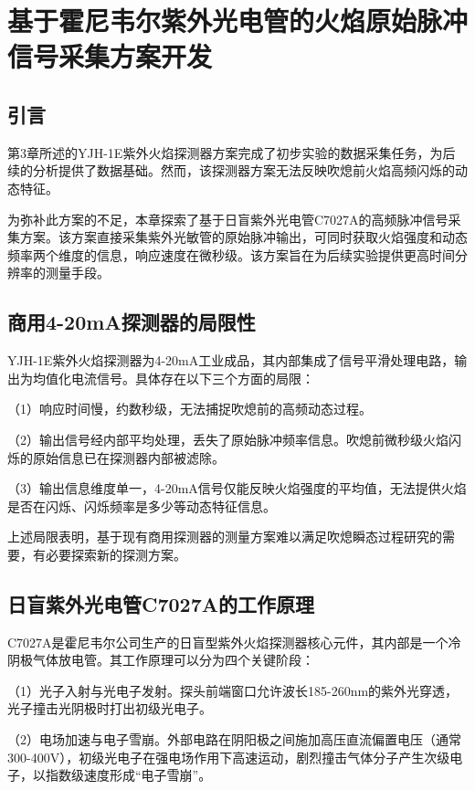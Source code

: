
\chapter{基于霍尼韦尔紫外光电管的火焰原始脉冲信号采集方案开发}

\section{引言}

第3章所述的YJH-1E紫外火焰探测器方案完成了初步实验的数据采集任务，为后续的分析提供了数据基础。然而，该探测器方案无法反映吹熄前火焰高频闪烁的动态特征。

为弥补此方案的不足，本章探索了基于日盲紫外光电管C7027A的高频脉冲信号采集方案。该方案直接采集紫外光敏管的原始脉冲输出，可同时获取火焰强度和动态频率两个维度的信息，响应速度在微秒级。该方案旨在为后续实验提供更高时间分辨率的测量手段。

\section{商用4-20mA探测器的局限性}

YJH-1E紫外火焰探测器为4-20mA工业成品，其内部集成了信号平滑处理电路，输出为均值化电流信号。具体存在以下三个方面的局限：

（1）响应时间慢，约数秒级，无法捕捉吹熄前的高频动态过程。

（2）输出信号经内部平均处理，丢失了原始脉冲频率信息。吹熄前微秒级火焰闪烁的原始信息已在探测器内部被滤除。

（3）输出信息维度单一，4-20mA信号仅能反映火焰强度的平均值，无法提供火焰是否在闪烁、闪烁频率是多少等动态特征信息。

上述局限表明，基于现有商用探测器的测量方案难以满足吹熄瞬态过程研究的需要，有必要探索新的探测方案。

\section{日盲紫外光电管C7027A的工作原理}

C7027A是霍尼韦尔公司生产的日盲型紫外火焰探测器核心元件，其内部是一个冷阴极气体放电管。其工作原理可以分为四个关键阶段：

（1）光子入射与光电子发射。探头前端窗口允许波长185-260nm的紫外光穿透，光子撞击光阴极时打出初级光电子。

（2）电场加速与电子雪崩。外部电路在阴阳极之间施加高压直流偏置电压（通常300-400V），初级光电子在强电场作用下高速运动，剧烈撞击气体分子产生次级电子，以指数级速度形成“电子雪崩”。

